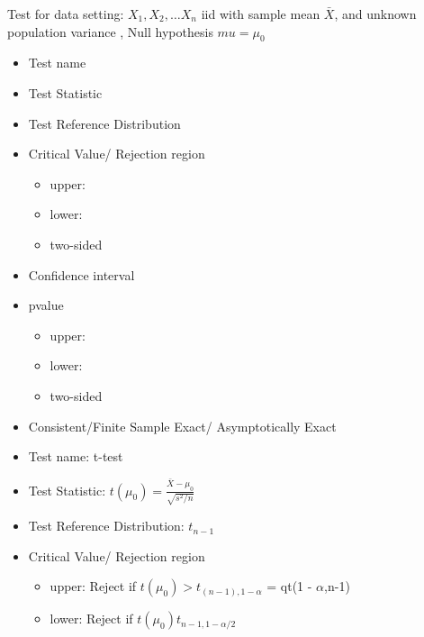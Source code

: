 \documentclass[12pt]{article}
\begin{document}
\begin{note}
    \begin{field}
        Test for data setting: $X_1, X_2, \ldots X_n$ iid with sample mean $\bar{X}$, and unknown population variance , Null hypothesis $mu = \mu_0$
            \begin{itemize}
              \item Test name
              \item Test Statistic
              \item Test Reference Distribution
              \item Critical Value/ Rejection region
              \begin{itemize}
                \item upper:
                \item lower:
                \item two-sided
              \end{itemize}
              \item Confidence interval
              \item pvalue
              \begin{itemize}
                \item upper:
                \item lower:
                \item two-sided
              \end{itemize}
              \item Consistent/Finite Sample Exact/ Asymptotically Exact
            \end{itemize}
    \end{field}
    \begin{field}
        \begin{itemize}
              \item Test name: t-test
              \item Test Statistic: $t(\mu_0) = \frac{\bar{X} - \mu_0}{\sqrt{s^2/n}}$
              \item Test Reference Distribution: $t_{n-1}$
              \item Critical Value/ Rejection region
              \begin{itemize}
                \item upper: Reject if $t(\mu_0) > t_{(n-1),1-\alpha}$ = qt(1 - $\alpha$,n-1)
                \item lower: Reject if $t(\mu_0)  t_{n-1,1-\alpha/2}$
              \end{itemize}

\end{itemize}
\end{field}
\end{note}
\end{document}
